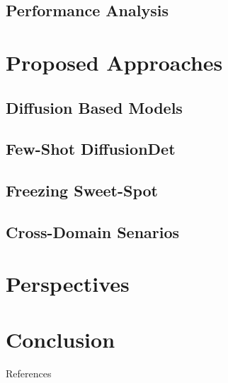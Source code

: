 \documentclass[xcolor=table, 8pt]{beamer}
\begin{document}
    \subsection{Performance Analysis}
    


    \section{Proposed Approaches}


    \subsection{Diffusion Based Models}
    

    \subsection{Few-Shot DiffusionDet}
    

    \subsection{Freezing Sweet-Spot}
    

    \subsection{Cross-Domain Senarios}
    
%
%
%
    \section{Perspectives}
    
    \section{Conclusion}
    


    \begin{frame}[allowframebreaks=]{References}
        \printbibliography
    \end{frame}
\end{document}
